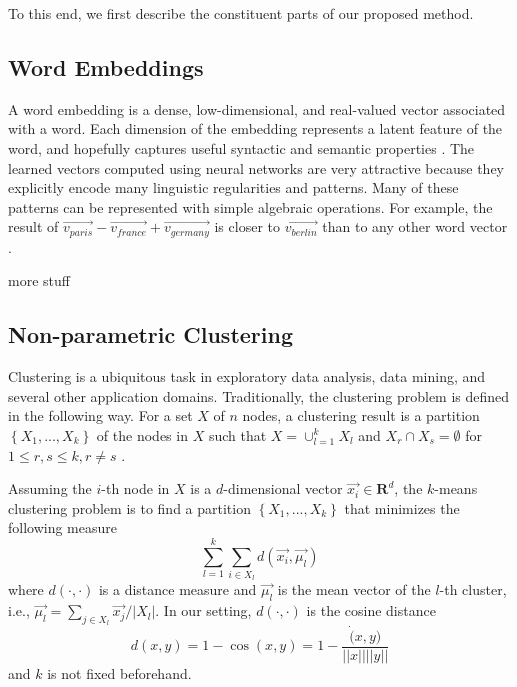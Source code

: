 \documentclass{article}
\begin{document}
To this end, we first describe the constituent parts of our proposed method.

\subsection{Word Embeddings}

A word embedding is a dense, low-dimensional, and real-valued vector associated with a word. Each dimension of the embedding represents a latent feature of the word, and hopefully captures useful syntactic and semantic properties \cite{Turian10wordrepresentations}.
The learned vectors computed using neural networks are very attractive because they explicitly encode many linguistic regularities and patterns. Many of these patterns can be represented with simple algebraic operations. For example, the result of $\vec{v_{paris}} - \vec{v_{france}} + \vec{v_{germany}}$ is closer to $\vec{v_{berlin}}$ than to any other word vector \cite{mikolovChen,mikolovYih}.

more stuff

\subsection{Non-parametric Clustering}

Clustering is a ubiquitous task in exploratory data analysis, data mining, and several other application domains. %
Traditionally, the clustering problem is defined in the following way. For a set $X$ of $n$ nodes, a clustering result is a partition $\left\{ {X_1, ..., X_k}\right\}$ of the nodes in $X$ such that $X=\cup_{l=1}^{k}{X_l}$ and $X_r \cap X_s = \emptyset$ for $1 \leq r,s \leq k, r \ne s$ \cite{ChiSZHT07}.

Assuming the $i$-th node in $X$ is a $d$-dimensional vector $\vec{x_i} \in \mathbf{R}^d$, the $k$-means clustering problem is to find a partition $\left\{ {X_1, ..., X_k}\right\}$ that minimizes the following measure
\begin{equation}
\sum_{l=1}^{k} \sum_{i \in X_l} d(\vec{x_i},\vec{\mu_l})
\end{equation}
where $d(\cdot,\cdot)$ is a distance measure and $\vec{\mu_l}$ is the mean vector of the $l$-th cluster, i.e., $\vec{\mu_l} = \sum_{j \in X_l}{\vec{x_j}/|X_l|}$.
In our setting, $d(\cdot,\cdot)$ is the cosine distance
\begin{equation}
d(x,y) = 1 - \cos(x,y) = 1 - \frac{\dot(x,y)}{||x||||y||}
\end{equation}
and $k$ is not fixed beforehand.
\end{document}
